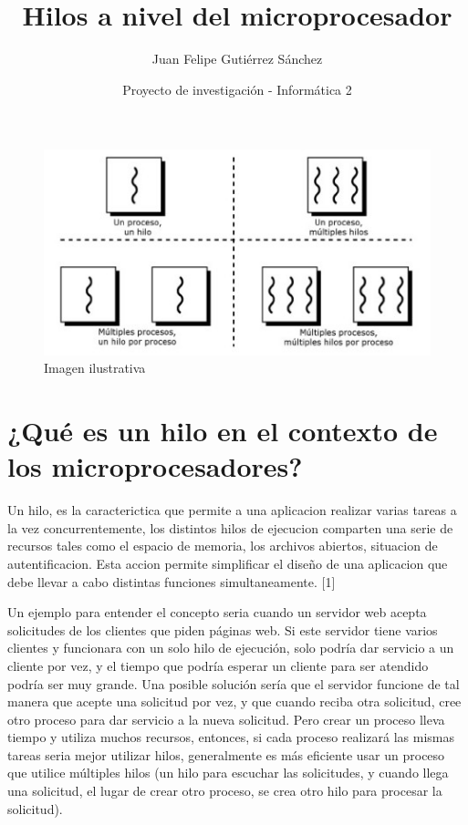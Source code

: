 \documentclass{article}
\title{Hilos a nivel del microprocesador}
\author{Juan Felipe Gutiérrez Sánchez }
\date{Proyecto de investigación - Informática 2}
\begin{document}
\maketitle
\begin{figure}
\centering
\includegraphics[width=1\textwidth]{foto-3.jpg}
\caption{\label{fig1} Imagen ilustrativa}
\end{figure}


\section{¿Qué es un hilo en el contexto de los microprocesadores?}

Un hilo, es la caracterictica que permite a una aplicacion realizar varias tareas a la vez concurrentemente, los distintos hilos de ejecucion comparten una serie de recursos tales como el espacio de memoria, los archivos abiertos, situacion de autentificacion. Esta accion permite simplificar el diseño de una aplicacion que debe llevar a cabo distintas funciones simultaneamente. [1]

Un ejemplo para entender el concepto seria cuando un servidor web acepta solicitudes de los clientes que piden páginas web. Si este servidor tiene varios clientes y funcionara con un solo hilo de ejecución, solo podría dar servicio a un cliente por vez, y el tiempo que podría esperar un cliente para ser atendido podría ser muy grande. Una posible solución sería que el servidor funcione de tal manera que acepte una solicitud por vez, y que cuando reciba otra solicitud, cree otro proceso para dar servicio a la nueva solicitud. Pero crear un proceso lleva tiempo y utiliza muchos recursos, entonces, si cada proceso realizará las mismas tareas seria mejor utilizar hilos, generalmente es más eficiente usar un proceso que utilice múltiples hilos (un hilo para escuchar las solicitudes, y cuando llega una solicitud, el lugar de crear otro proceso, se crea otro hilo para procesar la solicitud).
\end{document}
